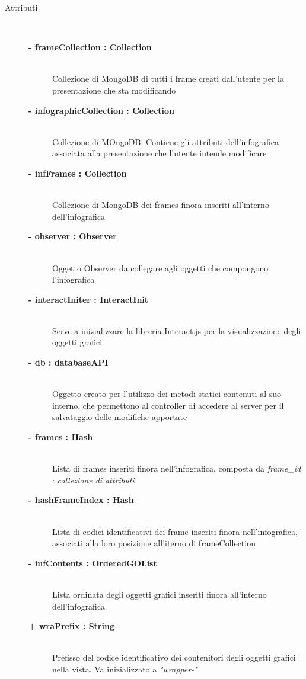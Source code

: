 \begin{description}
	
\item[Attributi] \hfill \\
	\begin{description}
		\item[\textbf{- frameCollection : Collection 			}] \hfill \\
			Collezione di MongoDB di tutti i frame creati dall'utente per la presentazione che sta modificando
		\item[\textbf{- infographicCollection : Collection			}] \hfill \\
			Collezione di MOngoDB. Contiene gli attributi dell'infografica associata alla presentazione che l'utente intende modificare
		\item[\textbf{- infFrames : Collection 			}] \hfill \\
			Collezione di MongoDB dei frames finora inseriti all'interno dell'infografica
		\item[\textbf{- observer : Observer 			}] \hfill \\
			Oggetto Observer da collegare agli oggetti che compongono l'infografica
		\item[\textbf{- interactIniter : InteractInit			}] \hfill \\
			Serve a inizializzare la libreria Interact.js per la visualizzazione degli oggetti grafici
		\item[\textbf{- db : databaseAPI			}] \hfill \\
			Oggetto creato per l'utilizzo dei metodi statici contenuti al suo interno, che permettono al controller di accedere al server per il salvataggio delle modifiche apportate 
		\item[\textbf{- frames : Hash			}] \hfill \\
			Lista di frames inseriti finora nell'infografica, composta da \textit{frame\_id} : \textit{collezione di attributi}
		\item[\textbf{- hashFrameIndex : Hash			}] \hfill \\
			Lista di codici identificativi dei frame inseriti finora nell'infografica, associati alla loro posizione all'iterno di frameCollection
		\item[\textbf{- infContents : OrderedGOList			}] \hfill \\
			Lista ordinata degli oggetti grafici inseriti finora all'interno dell'infografica
		\item[\textbf{+ wraPrefix : String			}] \hfill \\
			Prefisso del codice identificativo dei contenitori degli oggetti grafici nella vista. Va inizializzato a \textit{"wrapper-"}

\end{description}
\end{description}
